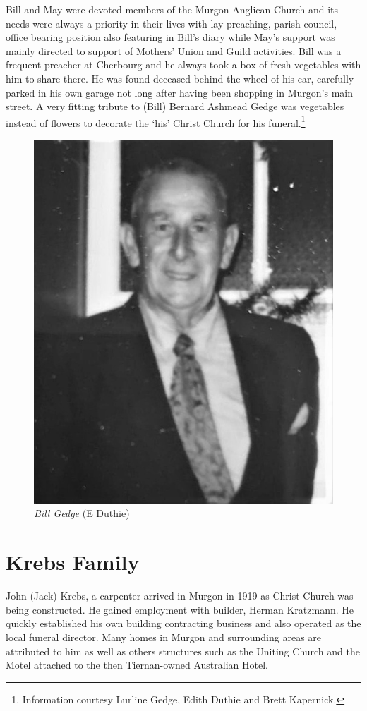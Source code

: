 Bill and May were devoted members of the Murgon Anglican Church and its needs were always a priority in their lives with lay preaching, parish council, office bearing position also featuring in Bill's diary while May's support was mainly directed to support of Mothers' Union and Guild activities. Bill was a frequent preacher at Cherbourg and he always took a box of fresh vegetables with him to share there. He was found deceased behind the wheel of his car, carefully parked in his own garage not long after having been shopping in Murgon's main street. A very fitting tribute to (Bill) Bernard Ashmead Gedge was vegetables instead of flowers to decorate the `his' Christ Church for his funeral.\footnote{Information courtesy Lurline Gedge, Edith Duthie and Brett Kapernick.}








\begin{figure}
\begin{center}
\includegraphics[width=.6\linewidth,center]{../images/BillGedge.jpg}
\caption{{\itshape Bill Gedge} {\scriptsize(E Duthie)}}
\end{center}
\end{figure}




\section{Krebs Family}



John (Jack) Krebs, a carpenter arrived in Murgon in 1919 as Christ Church was being constructed. He gained employment with builder, Herman Kratzmann. He quickly established his own building contracting business and also operated as the local funeral director. Many homes in Murgon and surrounding areas are attributed to him as well as others structures such as the Uniting Church and the Motel attached to the then Tiernan-owned Australian Hotel.









